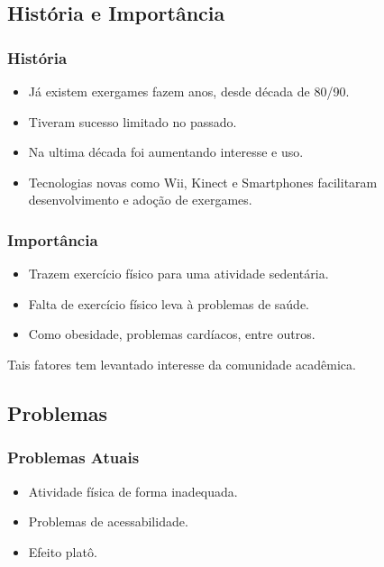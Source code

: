 \documentclass[brazil]{beamer}
\begin{document}
\subsection{História e Importância}
\begin{frame}
  \frametitle{História}
  \vspace{-10pt}
  \begin{itemize}
    \pause
    \item Já existem exergames fazem anos, desde década de 80/90.
    \vspace{10pt}
    \item Tiveram sucesso limitado no passado.
    \vspace{10pt}
    \item Na ultima década foi aumentando interesse e uso.
    \vspace{10pt}
    \item Tecnologias novas como Wii, Kinect e Smartphones facilitaram 
      desenvolvimento e adoção de exergames.
  \end{itemize}
\end{frame}
\begin{frame}
  \frametitle{Importância}
  \vspace{-10pt}
  \begin{itemize}
    \pause
    \item Trazem exercício físico para uma atividade sedentária.
    \vspace{10pt}
    \item Falta de exercício físico leva à problemas de saúde.
    \vspace{10pt}
    \item Como obesidade, problemas cardíacos, entre outros.
    \vspace{10pt}
  \end{itemize}
  \pause
  Tais fatores tem levantado interesse da comunidade acadêmica.
\end{frame}

\subsection{Problemas}
\begin{frame}
  \frametitle{Problemas Atuais}
  \vspace{-10pt}
  \begin{itemize}
    \pause
    \item Atividade física de forma inadequada.
    \vspace{10pt}
    \item Problemas de acessabilidade.
    \vspace{10pt}
    \item Efeito platô.
  \end{itemize}
\end{frame}
\end{document}
